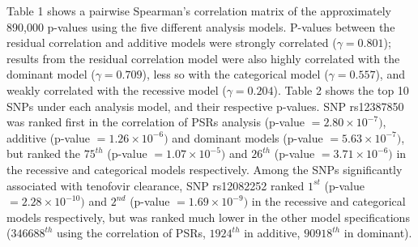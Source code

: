 \documentclass[12pt, usenatbib]{article}
\begin{document}
Table 1 shows a pairwise Spearman's correlation matrix of the approximately 890,000 p-values using the five different analysis models. P-values between the residual correlation and additive models were strongly correlated ($\gamma=0.801$); results from the residual correlation model were also highly correlated with the dominant model ($\gamma=0.709$), less so with the categorical model ($\gamma=0.557$), and weakly correlated with the recessive model ($\gamma=0.204$).  Table 2 shows the top 10 SNPs under each analysis model, and their respective p-values. SNP rs12387850 was ranked first in the correlation of PSRs analysis (p-value $= 2.80 \times 10^{-7})$, additive (p-value $= 1.26 \times 10^{-6})$ and dominant models (p-value $= 5.63 \times 10^{-7})$, but ranked the $75^{th}$ (p-value $= 1.07 \times 10^{-5})$ and $26^{th}$ (p-value $= 3.71 \times 10^{-6})$ in the recessive and categorical models respectively. Among the SNPs significantly associated with tenofovir clearance, SNP rs12082252 ranked $1^{st}$ (p-value $= 2.28 \times 10^{-10})$ and $2^{nd}$ (p-value $= 1.69 \times 10^{-9})$ in the recessive and categorical models respectively, but was ranked much lower in the other model specifications ($346688^{th}$ using the correlation of PSRs, $1924^{th}$ in additive, $90918^{th}$ in dominant).
\end{document}
